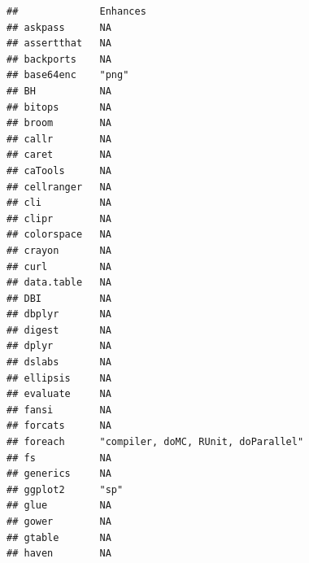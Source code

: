 \documentclass[]{article}
\begin{document}
\begin{verbatim}
##              Enhances                                                  
## askpass      NA                                                        
## assertthat   NA                                                        
## backports    NA                                                        
## base64enc    "png"                                                     
## BH           NA                                                        
## bitops       NA                                                        
## broom        NA                                                        
## callr        NA                                                        
## caret        NA                                                        
## caTools      NA                                                        
## cellranger   NA                                                        
## cli          NA                                                        
## clipr        NA                                                        
## colorspace   NA                                                        
## crayon       NA                                                        
## curl         NA                                                        
## data.table   NA                                                        
## DBI          NA                                                        
## dbplyr       NA                                                        
## digest       NA                                                        
## dplyr        NA                                                        
## dslabs       NA                                                        
## ellipsis     NA                                                        
## evaluate     NA                                                        
## fansi        NA                                                        
## forcats      NA                                                        
## foreach      "compiler, doMC, RUnit, doParallel"                       
## fs           NA                                                        
## generics     NA                                                        
## ggplot2      "sp"                                                      
## glue         NA                                                        
## gower        NA                                                        
## gtable       NA                                                        
## haven        NA                                                        

\end{verbatim}
\end{document}

